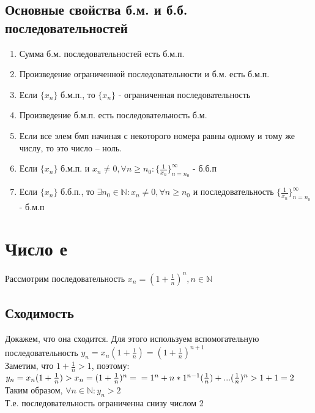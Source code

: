 \documentclass[oneside]{book}
\begin{document}
\begin{enumerate}
\section{Основные свойства б.м. и б.б. последовательностей}
\begin{enumerate}
\item Сумма б.м. последовательностей есть б.м.п.
\item Произведение ограниченной последовательности и б.м. есть б.м.п.
\item Если $\{x_n\}$ б.м.п., то $\{x_n\}$ - ограниченная последовательность
\item Произведение б.м.п. есть последовательность б.м.
\item Если все элем бмп начиная с некоторого номера равны одному и тому же числу, то это число -- ноль. 
\item Если $\{x_n\}$ б.м.п. и $x_n \neq 0,  \forall n\geq n_0: \{\frac{1}{x_n}\}^\infty_{n=n_0}$ - б.б.п
\item Если $\{x_n\}$ б.б.п., то $\exists n_0 \in \mathbb{N}:x_n \neq 0,  \forall n\geq n_0$ и последовательность $ \{\frac{1}{x_n}\}^\infty_{n=n_0}$ - б.м.п
\end{enumerate}



\setcounter{chapter}{7}
\chapter{Число е}
Рассмотрим последовательность $x_n=(1+\frac{1}{n})^n, n \in \mathbb{N}$\\
\section{Сходимость}
Докажем, что она сходится. Для этого используем вспомогательную последовательность
$y_n=x_n(1+\frac{1}{n})=(1+\frac{1}{n})^{n+1}$\\
Заметим, что $1+\frac{1}{n}>1$, поэтому:\\ $y_n=x_n(1+\frac{1}{n})>x_n=(1+\frac{1}{n})^n=\\=1^n+n*1^{n-1}(\frac{1}{n})+...(\frac{1}{n})^n>1+1=2$
\\Таким образом, $\forall n \in \mathbb{N} :y_n>2$
\\Т.е. последовательность ограниченна снизу числом 2

\end{enumerate}
\end{document}
